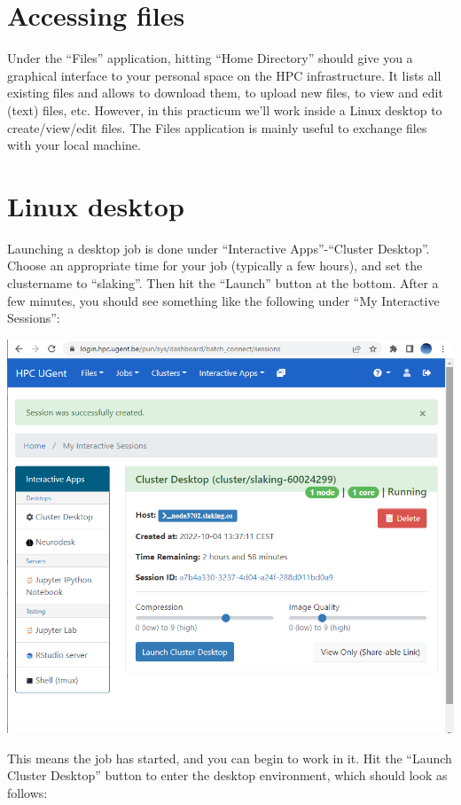\documentclass[a4paper]{article}
\begin{document}
\section{Accessing files}
%
\par
Under the ``Files'' application, hitting ``Home Directory'' should give you a graphical interface to your personal space on the HPC infrastructure. It lists all existing files and allows to download them, to upload new files, to view and edit (text) files, etc. However, in this practicum we'll work inside a Linux desktop to create/view/edit files. The Files application is mainly useful to exchange files with your local machine.
%
\section{Linux desktop}
%
\par
Launching a desktop job is done under ``Interactive Apps''-``Cluster Desktop''. Choose an appropriate time for your job (typically a few hours), and set the clustername to ``slaking''. Then hit the ``Launch'' button at the bottom. After a few minutes, you should see something like the following under ``My Interactive Sessions'':
%
\begin{center}
	\includegraphics[scale=.4]{launch_desktop}
\end{center}
%
This means the job has started, and you can begin to work in it. Hit the ``Launch Cluster Desktop'' button to enter the desktop environment, which should look as follows:
\end{document}
